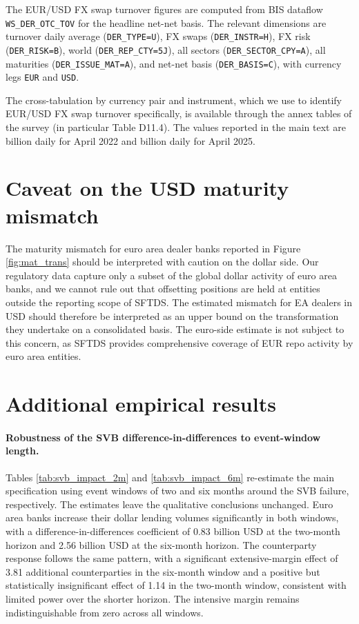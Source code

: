 \documentclass[english, 12pt, oneside]{article}
\begin{document}
{\sloppy The EUR/USD FX swap turnover figures are computed from BIS dataflow \texttt{WS\_DER\_OTC\_TOV}  for the headline net-net basis. The relevant dimensions are turnover daily average (\texttt{DER\_TYPE=U}), FX swaps (\texttt{DER\_INSTR=H}), FX risk (\texttt{DER\_RISK=B}), world (\texttt{DER\_REP\_CTY=5J}), all sectors (\texttt{DER\_SECTOR\_CPY=A}), all maturities (\texttt{DER\_ISSUE\_MAT=A}), and net-net basis (\texttt{DER\_BASIS=C}), with currency legs \texttt{EUR} and \texttt{USD}.\par}

 The cross-tabulation by currency pair and instrument, which we use to identify EUR/USD FX swap turnover specifically, is available  through the  annex tables of the survey (in particular Table D11.4). The values reported in the main text are  billion daily for April 2022 and  billion daily for April 2025.

\section{Caveat on the USD maturity mismatch}
\label{subsec:fact2}

The maturity mismatch for euro area dealer banks reported in Figure \ref{fig:mat_trans} should be interpreted with caution on the dollar side. Our regulatory data capture only a subset of the global dollar activity of euro area banks, and we cannot rule out that offsetting positions are held at entities outside the reporting scope of SFTDS. The estimated mismatch for EA dealers in USD should therefore be interpreted as an upper bound on the transformation they undertake on a consolidated basis. The euro-side estimate is not subject to this concern, as SFTDS provides comprehensive coverage of EUR repo activity by euro area entities.

\section{Additional empirical results}

\paragraph{Robustness of the SVB difference-in-differences to event-window length.} Tables \ref{tab:svb_impact_2m} and \ref{tab:svb_impact_6m} re-estimate the main specification using event windows of two and six months around the SVB failure, respectively. The estimates leave the qualitative conclusions unchanged. Euro area banks increase their dollar lending volumes significantly in both windows, with a difference-in-differences coefficient of 0.83 billion USD at the two-month horizon and 2.56 billion USD at the six-month horizon. The counterparty response follows the same pattern, with a significant extensive-margin effect of 3.81 additional counterparties in the six-month window and a positive but statistically insignificant effect of 1.14 in the two-month window, consistent with limited power over the shorter horizon. The intensive margin remains indistinguishable from zero across all windows.
\end{document}
